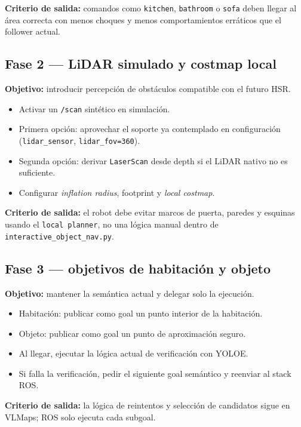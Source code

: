 \documentclass[11pt,a4paper]{article}
\begin{document}
\textbf{Criterio de salida:} comandos como \texttt{kitchen}, \texttt{bathroom}
o \texttt{sofa} deben llegar al área correcta con menos choques y menos
comportamientos erráticos que el follower actual.

\subsection{Fase 2 --- LiDAR simulado y costmap local}

\textbf{Objetivo:} introducir percepción de obstáculos compatible con el futuro
HSR.

\begin{itemize}
  \item Activar un \texttt{/scan} sintético en simulación.
  \item Primera opción: aprovechar el soporte ya contemplado en configuración
        (\texttt{lidar\_sensor}, \texttt{lidar\_fov=360}).
  \item Segunda opción: derivar \texttt{LaserScan} desde depth si el LiDAR nativo
        no es suficiente.
  \item Configurar \textit{inflation radius}, footprint y \textit{local costmap}.
\end{itemize}

\textbf{Criterio de salida:} el robot debe evitar marcos de puerta, paredes y
esquinas usando el \texttt{local planner}, no una lógica manual dentro de
\texttt{interactive\_object\_nav.py}.

\subsection{Fase 3 --- objetivos de habitación y objeto}

\textbf{Objetivo:} mantener la semántica actual y delegar solo la ejecución.

\begin{itemize}
  \item Habitación: publicar como goal un punto interior de la habitación.
  \item Objeto: publicar como goal un punto de aproximación seguro.
  \item Al llegar, ejecutar la lógica actual de verificación con YOLOE.
  \item Si falla la verificación, pedir el siguiente goal semántico y reenviar
        al stack ROS.
\end{itemize}

\textbf{Criterio de salida:} la lógica de reintentos y selección de candidatos
sigue en VLMaps; ROS solo ejecuta cada subgoal.
\end{document}
